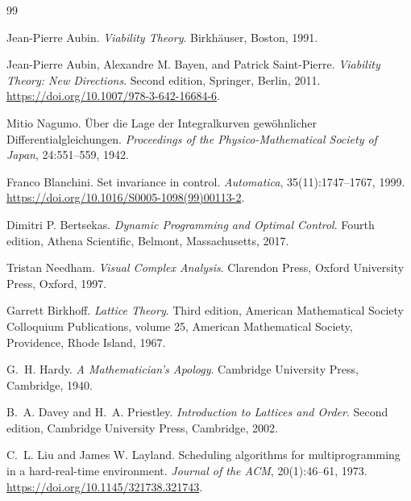 \documentclass[11pt]{report}
\begin{document}
\begin{thebibliography}{99}


Jean-Pierre Aubin.
\newblock \emph{Viability Theory}.
\newblock Birkh\"auser, Boston, 1991.

Jean-Pierre Aubin, Alexandre M. Bayen, and Patrick Saint-Pierre.
\newblock \emph{Viability Theory: New Directions}.
\newblock Second edition, Springer, Berlin, 2011.
\newblock \url{https://doi.org/10.1007/978-3-642-16684-6}.

Mitio Nagumo.
\newblock \"Uber die Lage der Integralkurven gew\"ohnlicher
Differentialgleichungen.
\newblock \emph{Proceedings of the Physico-Mathematical Society of Japan},
24:551--559, 1942.

Franco Blanchini.
\newblock Set invariance in control.
\newblock \emph{Automatica}, 35(11):1747--1767, 1999.
\newblock \url{https://doi.org/10.1016/S0005-1098(99)00113-2}.

Dimitri P. Bertsekas.
\newblock \emph{Dynamic Programming and Optimal Control}.
\newblock Fourth edition, Athena Scientific, Belmont, Massachusetts, 2017.

Tristan Needham.
\newblock \emph{Visual Complex Analysis}.
\newblock Clarendon Press, Oxford University Press, Oxford, 1997.

Garrett Birkhoff.
\newblock \emph{Lattice Theory}.
\newblock Third edition, American Mathematical Society Colloquium
Publications, volume 25, American Mathematical Society,
Providence, Rhode Island, 1967.

G.~H. Hardy.
\newblock \emph{A Mathematician's Apology}.
\newblock Cambridge University Press, Cambridge, 1940.


B.~A. Davey and H.~A. Priestley.
\newblock \emph{Introduction to Lattices and Order}.
\newblock Second edition, Cambridge University Press, Cambridge, 2002.

C.~L. Liu and James W. Layland.
\newblock Scheduling algorithms for multiprogramming in a hard-real-time
environment.
\newblock \emph{Journal of the ACM}, 20(1):46--61, 1973.
\newblock \url{https://doi.org/10.1145/321738.321743}.


\end{thebibliography}
\end{document}
